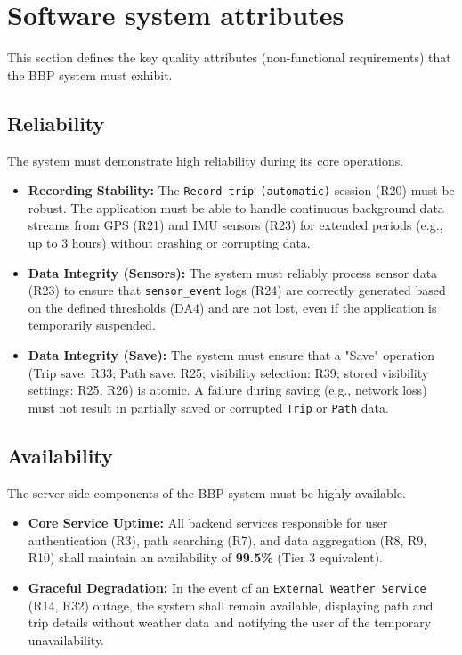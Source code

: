 \section{Software system attributes}
\label{sec:software_system_attributes}%
This section defines the key quality attributes (non-functional requirements) that the BBP system must exhibit.

\subsection{Reliability}
\label{subsec:reliability}%
The system must demonstrate high reliability during its core operations.
\begin{itemize}[leftmargin=*, itemsep=2pt]
    \item \textbf{Recording Stability:} The \texttt{Record trip (automatic)} session (R20) must be robust. The application must be able to handle continuous background data streams from GPS (R21) and IMU sensors (R23) for extended periods (e.g., up to 3 hours) without crashing or corrupting data.
    \item \textbf{Data Integrity (Sensors):} The system must reliably process sensor data (R23) to ensure that \texttt{sensor\_event} logs (R24) are correctly generated based on the defined thresholds (DA4) and are not lost, even if the application is temporarily suspended.
    \item \textbf{Data Integrity (Save):} The system must ensure that a "Save" operation (Trip save: R33; Path save: R25; visibility selection: R39; stored visibility settings: R25, R26) is atomic. A failure during saving (e.g., network loss) must not result in partially saved or corrupted \texttt{Trip} or \texttt{Path} data.
\end{itemize}

\subsection{Availability}
\label{subsec:availability}%
The server-side components of the BBP system must be highly available.
\begin{itemize}[leftmargin=*, itemsep=2pt]
    \item \textbf{Core Service Uptime:} All backend services responsible for user authentication (R3), path searching (R7), and data aggregation (R8, R9, R10) shall maintain an availability of \textbf{99.5\%} (Tier 3 equivalent).
    \item \textbf{Graceful Degradation:} In the event of an \texttt{External Weather Service} (R14, R32) outage, the system shall remain available, displaying path and trip details without weather data and notifying the user of the temporary unavailability.
\end{itemize}


